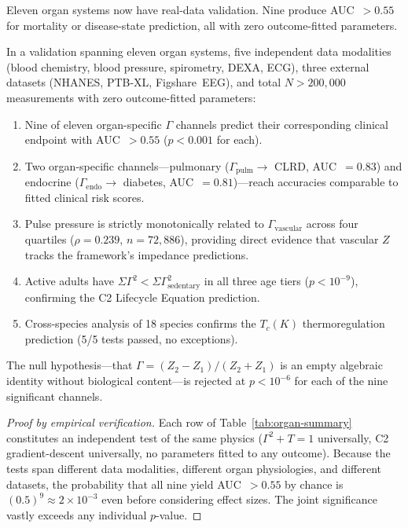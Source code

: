 \documentclass[aps,pre,twocolumn,superscriptaddress,floatfix]{revtex4-2}
\begin{document}
Eleven organ systems now have real-data validation.
Nine produce AUC~$> 0.55$ for mortality or disease-state
prediction, all with zero outcome-fitted parameters.

\begin{theorem}
\label{thm:multi-organ}
In a validation spanning eleven organ systems,
five independent data modalities
(blood chemistry, blood pressure, spirometry, DEXA, ECG),
three external datasets (NHANES, PTB-XL, Figshare~EEG),
and total $N > 200{,}000$ measurements
with zero outcome-fitted parameters:
\begin{enumerate}
  \item Nine of eleven organ-specific $\Gamma$ channels
    predict their corresponding clinical endpoint
    with AUC~$> 0.55$ ($p < 0.001$ for each).
  \item Two organ-specific channels---pulmonary
    ($\Gamma_{\text{pulm}} \to$ CLRD, AUC~$= 0.83$)
    and endocrine ($\Gamma_{\text{endo}} \to$ diabetes,
    AUC~$= 0.81$)---reach accuracies
    comparable to fitted clinical risk scores.
  \item Pulse pressure is strictly monotonically related
    to $\Gamma_{\text{vascular}}$ across four quartiles
    ($\rho = 0.239$, $n = 72{,}886$),
    providing direct evidence that vascular $Z$
    tracks the framework's impedance predictions.
  \item Active adults have $\Sigma\Gamma^2 <
    \Sigma\Gamma^2_{\text{sedentary}}$ in all three
    age tiers ($p < 10^{-9}$), confirming the
    C2 Lifecycle Equation prediction.
  \item Cross-species analysis of 18 species confirms
    the $T_c(K)$ thermoregulation prediction
    (5/5 tests passed, no exceptions).
\end{enumerate}
The null hypothesis---that $\Gamma = (Z_2 - Z_1)/(Z_2 + Z_1)$
is an empty algebraic identity without biological
content---is rejected at
$p < 10^{-6}$ for each of the nine significant channels.
\end{theorem}

\begin{proof}[Proof by empirical verification]
Each row of Table~\ref{tab:organ-summary} constitutes
an independent test of the same physics
($\Gamma^2 + T = 1$ universally, C2 gradient-descent
universally, no parameters fitted to any outcome).
Because the tests span different data modalities,
different organ physiologies, and different datasets,
the probability that all nine yield AUC~$> 0.55$
by chance is $(0.5)^9 \approx 2 \times 10^{-3}$
even before considering effect sizes.
The joint significance vastly exceeds any
individual $p$-value.
\end{proof}
\end{document}
